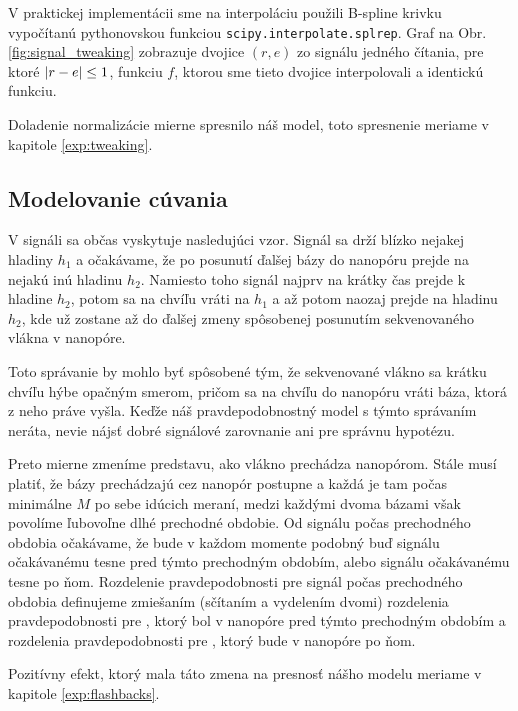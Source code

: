 V praktickej implementácii sme na interpoláciu použili B-spline krivku vypočítanú pythonovskou
funkciou \texttt{scipy.interpolate.splrep}. Graf na Obr. \ref{fig:signal_tweaking} zobrazuje dvojice $(r, e)$
zo signálu jedného čítania, pre ktoré $\abs*{r - e} \leq 1$, funkciu $f$, ktorou sme tieto dvojice interpolovali a identickú funkciu.

Doladenie normalizácie mierne spresnilo náš model, toto spresnenie meriame v kapitole \ref{exp:tweaking}.

\subsection{Modelovanie cúvania}
\label{upg:flashbacks}

V signáli sa občas vyskytuje nasledujúci vzor. Signál sa drží blízko nejakej hladiny $h_1$ a očakávame, 
že po posunutí ďalšej bázy do nanopóru prejde na nejakú inú hladinu $h_2$. Namiesto toho signál 
najprv na krátky čas prejde k hladine $h_2$, potom sa na chvíľu vráti na $h_1$ a až potom naozaj prejde
na hladinu $h_2$, kde už zostane až do ďalšej zmeny spôsobenej posunutím sekvenovaného vlákna v nanopóre.


Toto správanie by mohlo byť spôsobené tým, že sekvenované vlákno sa krátku chvíľu hýbe opačným smerom,
pričom sa na chvíľu do nanopóru vráti báza, ktorá z neho práve vyšla. Keďže náš pravdepodobnostný
model s týmto správaním neráta, nevie nájsť dobré signálové zarovnanie ani pre správnu hypotézu.

Preto mierne zmeníme predstavu, ako vlákno prechádza nanopórom. Stále musí platiť, že bázy prechádzajú 
cez
nanopór postupne a každá je tam počas minimálne $M$ po sebe idúcich meraní, medzi každými dvoma
bázami však povolíme ľubovoľne dlhé prechodné obdobie. Od signálu počas prechodného obdobia očakávame, 
že bude v každom momente podobný buď signálu očakávanému tesne pred týmto prechodným obdobím, alebo 
signálu očakávanému tesne po ňom. Rozdelenie pravdepodobnosti pre signál počas prechodného obdobia
definujeme zmiešaním (sčítaním a vydelením dvomi) rozdelenia pravdepodobnosti pre \kmer{}, ktorý bol 
v nanopóre pred týmto prechodným obdobím a rozdelenia pravdepodobnosti pre \kmer{}, ktorý
bude v nanopóre po ňom.

Pozitívny efekt, ktorý mala táto zmena na presnosť nášho modelu meriame v kapitole \ref{exp:flashbacks}.
